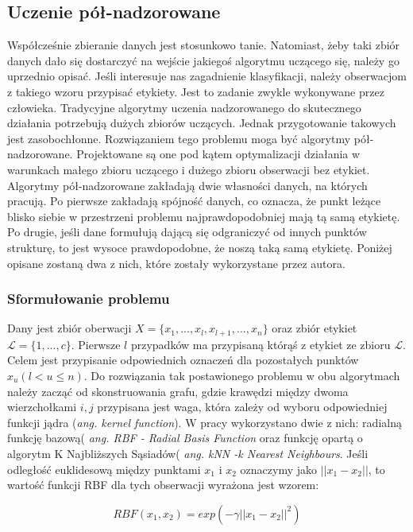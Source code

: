 \documentclass{article}
\begin{document}
\subsection{Uczenie pół-nadzorowane}
Współcześnie zbieranie danych jest stosunkowo tanie.
Natomiast, żeby taki zbiór danych dało się dostarczyć na wejście jakiegoś algorytmu uczącego się, należy go uprzednio opisać.
Jeśli interesuje nas zagadnienie klasyfikacji, należy obserwacjom z takiego wzoru przypisać etykiety.
Jest to zadanie zwykle wykonywane przez człowieka.
Tradycyjne algorytmy uczenia nadzorowanego do skutecznego działania potrzebują dużych zbiorów uczących. 
Jednak przygotowanie takowych jest zasobochłonne.
Rozwiązaniem tego problemu moga być algorytmy pół-nadzorowane.
Projektowane są one pod kątem optymalizacji działania w warunkach małego zbioru uczącego i dużego zbioru obserwacji bez etykiet.
Algorytmy pół-nadzorowane zakładają dwie własności danych, na których pracują.
Po pierwsze zakładają spójność danych, co oznacza, że punkt leżące blisko siebie w przestrzeni problemu najprawdopodobniej mają tą samą etykietę.
Po drugie, jeśli dane formułują dającą się odgraniczyć od innych punktów strukturę, to jest wysoce prawdopodobne, że noszą taką samą etykietę\cite{Zhou2004}.
Poniżej opisane zostaną dwa z nich, które zostały wykorzystane przez autora.
\subsubsection{Sformułowanie problemu}
\label{roz_semi_sformulowanie}
Dany jest zbiór oberwacji \(X = \{x_1, ..., x_l, x_{l+1}, ..., x_n\}\) oraz zbiór etykiet \(\mathcal{L} = \{1, ... ,c\}\).
Pierwsze \(l\) przypadków ma przypisaną którąś z etykiet ze zbioru \(\mathcal{L}\). Celem jest przypisanie odpowiednich oznaczeń dla pozostałych punktów \(x_u(l  < u \leqslant n)\).
Do rozwiązania tak postawionego problemu w obu algorytmach należy zacząć od skonstruowania grafu, gdzie krawędzi między dwoma wierzchołkami \(i, j\) przypisana jest waga, która zależy od wyboru odpowiedniej funkcji jądra (\emph{ang. kernel function}). W pracy wykorzystano dwie z nich: radialną funkcję bazową( \emph{ang. RBF - Radial Basis Function} oraz funkcję opartą o algorytm K Najbliższych Sąsiadów( \emph{ang. kNN -k Nearest Neighbours}. Jeśli odległość euklidesową między punktami \(x_1\) i \(x_2\) oznaczymy jako \(||x_1 - x_2||\), to wartość funkcji RBF dla tych obserwacji wyrażona jest wzorem:

\[RBF(x_1, x_2) = exp(-\gamma||x_1 - x_2||^2)\]
\end{document}
